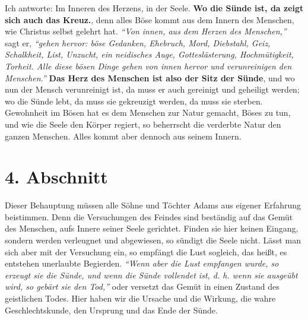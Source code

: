 \label{ref:03_03_ort_des_kreuzes}
Ich antworte: Im Inneren des Herzens, in der Seele. \textbf{Wo die Sünde ist,
da zeigt
sich auch das Kreuz.}, denn alles Böse kommt aus dem Innern des Menschen, wie
Christus selbst gelehrt hat.
\textit{"`Von innen, aus dem Herzen des Menschen,"'} sagt er,
\textit{"`gehen hervor: böse Gedanken, Ehebruch, Mord, Diebstahl, Geiz,
Schalkheit,
List, Unzucht, ein neidisches Auge, Gotteslästerung,
Hochmütigkeit,
Torheit. Alle
diese bösen Dinge gehen von innen hervor und verunreinigen den
Menschen."'}
\textbf{Das Herz des Menschen ist also der Sitz der Sünde},
 und wo nun der Mensch
verunreinigt ist, da muss er auch gereinigt und
geheiligt werden; wo die Sünde lebt, da muss sie gekreuzigt werden, da muss sie
sterben. Gewohnheit im Bösen hat es dem Menschen zur Natur gemacht, Böses zu
tun, und wie die Seele den Körper regiert, so beherrscht die verderbte Natur
den ganzen Menschen. Alles kommt aber dennoch aus seinem Innern.

\section{4. Abschnitt} \label{kap3_ab4}

Dieser Behauptung müssen alle Söhne und Töchter Adams aus eigener Erfahrung
beistimmen. Denn die Versuchungen des Feindes sind beständig auf das Gemüt des
Menschen, aufs Innere seiner Seele gerichtet. Finden sie hier keinen Eingang,
sondern werden verleugnet und abgewiesen, so sündigt die Seele nicht. Lässt man
sich aber mit der Versuchung ein, so empfängt die Lust sogleich, das heißt, es
entstehen unerlaubte Begierden.
\textit{"`Wenn aber die Lust empfangen wurde, so erzeugt
sie die Sünde, und wenn die Sünde vollendet ist, d. h. wenn sie ausgeübt wird,
so gebärt sie den Tod,"'}
oder versetzt das Gemüt in einen
Zustand des geistlichen Todes. Hier haben wir die
Ursache und die Wirkung, die
wahre Geschlechtskunde, den Ursprung und das Ende der Sünde.

\medskip

